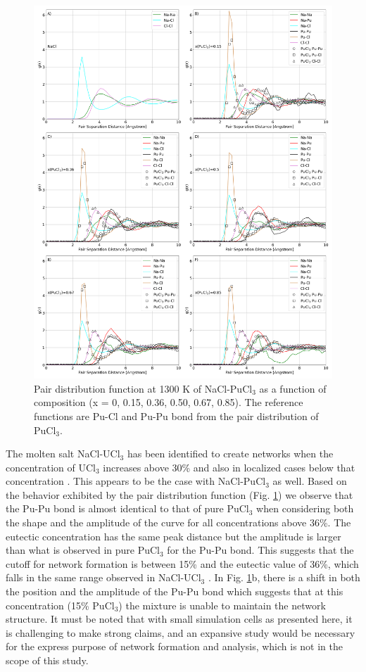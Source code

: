 \documentclass[review]{elsarticle}
\begin{document}
\begin{figure}[h!]
 \centering
 \includegraphics[width=\textwidth]{rdf_comp_to_pucl3.png} 
 \caption{Pair distribution function at 1300 K of NaCl-PuCl$_3$ as a function of composition (x = 0, 0.15, 0.36, 0.50, 0.67, 0.85). The reference functions are Pu-Cl and Pu-Pu bond from the pair distribution of PuCl$_3$. }
 \label{fig:rdf_comp}
\end{figure} 

The molten salt NaCl-UCl$_3$ has been identified to create networks when the concentration of UCl$_3$ increases above 30\% and also in localized cases below that concentration \cite{li2019first}. This appears to be the case with NaCl-PuCl$_3$ as well. Based on the behavior exhibited by the pair distribution function (Fig. \ref{fig:rdf_comp}) we observe that the Pu-Pu bond is almost identical to that of pure PuCl$_3$ when considering both the shape and the amplitude of the curve for all concentrations above 36\%. The eutectic concentration has the same peak distance but the amplitude is larger than what is observed in pure PuCl$_3$ for the Pu-Pu bond. This suggests that the cutoff for network formation is between 15\% and the eutectic value of 36\%, which falls in the same range observed in NaCl-UCl$_3$ \cite{ANDERSSON2022153836}. In Fig. \ref{fig:rdf_comp}b, there is a shift in both the position and the amplitude of the Pu-Pu bond which suggests that at this concentration (15\% PuCl$_3$) the mixture is unable to maintain the network structure. It must be noted that with small simulation cells as presented here, it is challenging to make strong claims, and an expansive study would be necessary for the express purpose of network formation and analysis, which is not in the scope of this study. 
\end{document}
